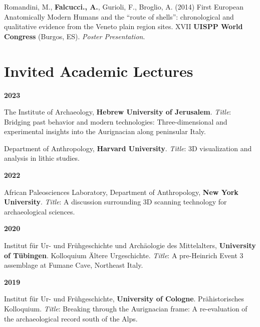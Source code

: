 \documentclass[11pt,a4paper,]{awesome-cv}
\begin{document}
Romandini, M., \textbf{Falcucci., A.}, Gurioli, F., Broglio, A. (2014)
First European Anatomically Modern Humans and the ``route of shells'':
chronological and qualitative evidence from the Veneto plain region
sites. XVII \textbf{UISPP World Congress} (Burgos, ES). \emph{Poster
Presentation}.

\setlength{\leftskip}{0cm}

\hypertarget{invited-academic-lectures}{%
\section{Invited Academic Lectures}\label{invited-academic-lectures}}

\setlength{\leftskip}{0cm}

\textbf{2023}

\setlength{\leftskip}{1cm}

The Institute of Archaeology, \textbf{Hebrew University of Jerusalem}.
\emph{Title}: Bridging past behavior and modern technologies:
Three-dimensional and experimental insights into the Aurignacian along
peninsular Italy.

Department of Anthropology, \textbf{Harvard University}. \emph{Title}:
3D visualization and analysis in lithic studies.

\setlength{\leftskip}{0cm}

\textbf{2022}

\setlength{\leftskip}{1cm}

African Paleosciences Laboratory, Department of Anthropology,
\textbf{New York University}. \emph{Title}: A discussion surrounding 3D
scanning technology for archaeological sciences.

\setlength{\leftskip}{0cm}

\textbf{2020}

\setlength{\leftskip}{1cm}

Institut für Ur- und Frühgeschichte und Archäologie des Mittelalters,
\textbf{University of Tübingen}. Kolloquium Ältere Urgeschichte.
\emph{Title}: A pre-Heinrich Event 3 assemblage at Fumane Cave,
Northeast Italy.

\setlength{\leftskip}{0cm}

\textbf{2019}

\setlength{\leftskip}{1cm}

Institut für Ur- und Frühgeschichte, \textbf{University of Cologne}.
Prähistorisches Kolloquium. \emph{Title}: Breaking through the
Aurignacian frame: A re-evaluation of the archaeological record south of
the Alps.
\end{document}
